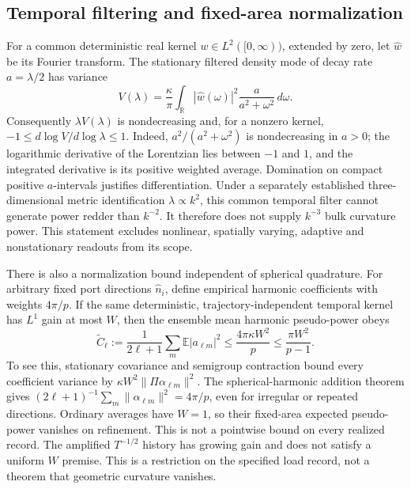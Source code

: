 \subsection{Temporal filtering and fixed-area normalization}
\label{subsec:native-filter-boundary}
For a common deterministic real kernel \(w\in L^2([0,\infty))\), extended
by zero, let \(\widehat w\) be its Fourier transform. The stationary
filtered density mode of decay rate \(a=\lambda/2\) has variance
\[
 V(\lambda)=\frac\kappa\pi\int_{\mathbb R}
       |\widehat w(\omega)|^2\frac a{a^2+\omega^2}\,d\omega.
\]
Consequently \(\lambda V(\lambda)\) is nondecreasing and, for a nonzero
kernel, \(-1\le d\log V/d\log\lambda\le1\). Indeed,
\(a^2/(a^2+\omega^2)\) is nondecreasing in \(a>0\); the logarithmic
derivative of the Lorentzian lies between \(-1\) and \(1\), and the
integrated derivative is its positive weighted average. Domination on
compact positive \(a\)-intervals justifies differentiation. Under a
separately established three-dimensional metric identification
\(\lambda\propto k^2\), this common temporal filter cannot generate
power redder than \(k^{-2}\). It therefore does not supply \(k^{-3}\)
bulk curvature power. This statement excludes nonlinear, spatially varying,
adaptive and nonstationary readouts from its scope.

There is also a normalization bound independent of spherical quadrature.
For arbitrary fixed port directions \(\hat n_i\), define empirical harmonic
coefficients with weights \(4\pi/p\). If the same deterministic,
trajectory-independent temporal kernel has \(L^1\) gain at most \(W\),
then the ensemble mean harmonic pseudo-power obeys
\[
 \widetilde C_\ell:=\frac1{2\ell+1}\sum_m\mathbb E|a_{\ell m}|^2
 \le\frac{4\pi\kappa W^2}{p}
                  \le\frac{\pi W^2}{p-1}.
\]
To see this, stationary covariance and semigroup contraction bound every
coefficient variance by \(\kappa W^2\|\Pi\alpha_{\ell m}\|^2\).
The spherical-harmonic addition theorem gives
\((2\ell+1)^{-1}\sum_m\|\alpha_{\ell m}\|^2=4\pi/p\), even for
irregular or repeated directions. Ordinary averages have \(W=1\), so
their fixed-area expected pseudo-power vanishes on refinement. This is
not a pointwise bound on every realized record. The amplified
\(T^{-1/2}\) history has growing gain and does not satisfy a uniform
\(W\) premise. This is a restriction on the specified load record,
not a theorem that geometric curvature vanishes.

